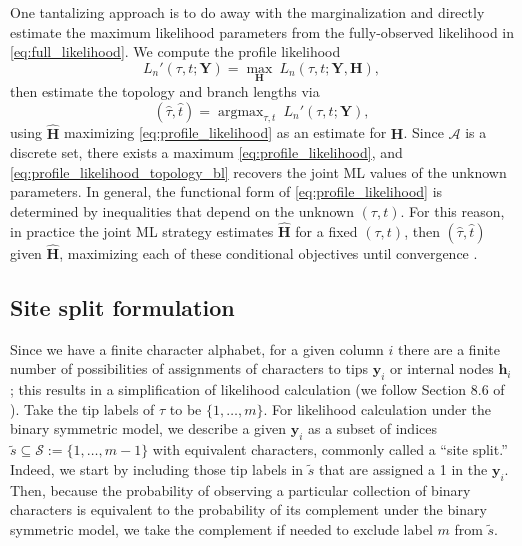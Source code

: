 \documentclass[a4paper]{article}
\newcommand{\alphabet}{\mathcal{A}}
\newcommand{\fullAlignment}{\mathbf{Y}}
\newcommand{\alignmentColumn}{\mathbf{y}}
\newcommand{\siteSplit}{\tilde{s}}
\newcommand{\siteSplitSet}{\mathcal{S}}
\newcommand{\fullAncestralStates}{\mathbf{H}}
\newcommand{\ancestralStateColumn}{\mathbf{h}}
\newcommand{\nCols}{n}
\newcommand{\nSiteRows}{m}
\DeclareMathOperator*{\argmax}{argmax}
\begin{document}
One tantalizing approach is to do away with the marginalization and directly estimate the maximum likelihood parameters from the fully-observed likelihood in \eqref{eq:full_likelihood}.
We compute the profile likelihood
\begin{equation}
\label{eq:profile_likelihood}
L_\nCols'(\tau, t; \fullAlignment) = \max_{\fullAncestralStates} \ L_\nCols(\tau, t; \fullAlignment, \fullAncestralStates),
\end{equation}
then estimate the topology and branch lengths via
\begin{equation}
\label{eq:profile_likelihood_topology_bl}
(\hat{\tau}, \hat{t}) = \argmax_{\tau, t} \ L_\nCols'(\tau, t; \fullAlignment),
\end{equation}
using $\hat{\fullAncestralStates}$ maximizing \eqref{eq:profile_likelihood} as an estimate for $\fullAncestralStates$.
Since $\alphabet$ is a discrete set, there exists a maximum \eqref{eq:profile_likelihood}, and \eqref{eq:profile_likelihood_topology_bl} recovers the joint ML values of the unknown parameters.
In general, the functional form of \eqref{eq:profile_likelihood} is determined by inequalities that depend on the unknown $(\tau,t)$.
For this reason, in practice the joint ML strategy estimates $\hat{\fullAncestralStates}$ for a fixed $(\tau,t)$, then $(\hat{\tau},\hat{t})$ given $\hat{\fullAncestralStates}$, maximizing each of these conditional objectives until convergence \cite{Neher2017}.

\subsection{Site split formulation}

Since we have a finite character alphabet, for a given column $i$ there are a finite number of possibilities of assignments of characters to tips $\alignmentColumn_i$ or internal nodes $\ancestralStateColumn_i$; this results in a simplification of likelihood calculation (we follow Section 8.6 of \cite{Semple2003-em}).
Take the tip labels of $\tau$ to be $\{1,\ldots,\nSiteRows\}$.
For likelihood calculation under the binary symmetric model, we describe a given $\alignmentColumn_i$ as a subset of indices $\siteSplit\subseteq\siteSplitSet:=\{1,\ldots,\nSiteRows-1\}$ with equivalent characters, commonly called a ``site split.''
Indeed, we start by including those tip labels in $\siteSplit$ that are assigned a 1 in the $\alignmentColumn_i$.
Then, because the probability of observing a particular collection of binary characters is equivalent to the probability of its complement under the binary symmetric model, we take the complement if needed to exclude label $\nSiteRows$ from $\siteSplit$.
\end{document}
